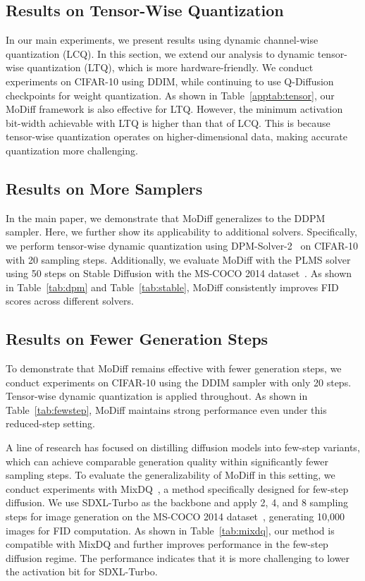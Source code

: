 \subsection{Results on Tensor-Wise Quantization}
\label{subsec:tensor}
In our main experiments, we present results using dynamic channel-wise quantization (LCQ). In this section, we extend our analysis to dynamic tensor-wise quantization (LTQ), which is more hardware-friendly. We conduct experiments on CIFAR-10 using DDIM, while continuing to use Q-Diffusion checkpoints for weight quantization. As shown in Table~\ref{apptab:tensor}, our MoDiff framework is also effective for LTQ. However, the minimum activation bit-width achievable with LTQ is higher than that of LCQ. This is because tensor-wise quantization operates on higher-dimensional data, making accurate quantization more challenging.


\subsection{Results on More Samplers}
\label{appsec:sampler}
In the main paper, we demonstrate that MoDiff generalizes to the DDPM sampler. Here, we further show its applicability to additional solvers. Specifically, we perform tensor-wise dynamic quantization using DPM-Solver-2~\citep{lu2022dpm} on CIFAR-10 with 20 sampling steps. Additionally, we evaluate MoDiff with the PLMS solver using 50 steps on Stable Diffusion with the MS-COCO 2014 dataset~\citep{liu2022pseudo}. As shown in Table~\ref{tab:dpm} and Table~\ref{tab:stable}, MoDiff consistently improves FID scores across different solvers.



\subsection{Results on Fewer Generation Steps}
\label{appsec:fewstep}
To demonstrate that MoDiff remains effective with fewer generation steps, we conduct experiments on CIFAR-10 using the DDIM sampler with only 20 steps. Tensor-wise dynamic quantization is applied throughout. As shown in Table~\ref{tab:fewstep}, MoDiff maintains strong performance even under this reduced-step setting.



A line of research has focused on distilling diffusion models into few-step variants, which can achieve comparable generation quality within significantly fewer sampling steps. To evaluate the generalizability of MoDiff in this setting, we conduct experiments with MixDQ~\citep{zhao2024mixdq}, a method specifically designed for few-step diffusion. We use SDXL-Turbo as the backbone and apply 2, 4, and 8 sampling steps for image generation on the MS-COCO 2014 dataset~\citep{lin2014microsoft}, generating 10,000 images for FID computation. As shown in Table~\ref{tab:mixdq}, our method is compatible with MixDQ and further improves performance in the few-step diffusion regime. The performance indicates that it is more challenging to lower the activation bit for SDXL-Turbo.

